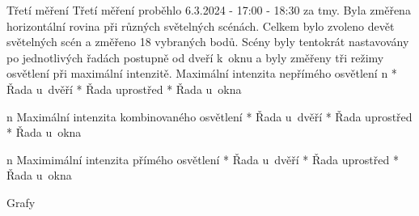 \sec Třetí měření
Třetí měření proběhlo 6.3.2024 - 17:00 - 18:30 za tmy. Byla změřena horizontální rovina při různých světelných scénách.
Celkem bylo zvoleno devět světelných scén a změřeno 18 vybraných bodů. Scény byly tentokrát nastavovány po jednotlivých
řadách postupně od dveří k~oknu a byly změřeny tři režimy osvětlení při maximální intenzitě.
\medskip
{\sbf Maximální intenzita nepřímého osvětlení}
\medskip
\begitems \style n
    * Řada u~dvěří
    \medskip
    * Řada uprostřed
    \medskip
    * Řada u~okna
\enditems

\medskip
\begitems \style n
{\sbf Maximální intenzita kombinovaného osvětlení}
\medskip
    * Řada u~dvěří
    \medskip
    * Řada uprostřed
    \medskip
    * Řada u~okna
\enditems
\medskip

\begitems \style n
{\sbf Maximimální intenzita přímého osvětlení}
\medskip
    * Řada u~dvěří
    \medskip
    * Řada uprostřed
    \medskip
    * Řada u~okna
\enditems
\medskip

\secc Grafy

\medskip
\medskip
\medskip
\midinsert
{}
\endinsert

\medskip
\medskip
\medskip


